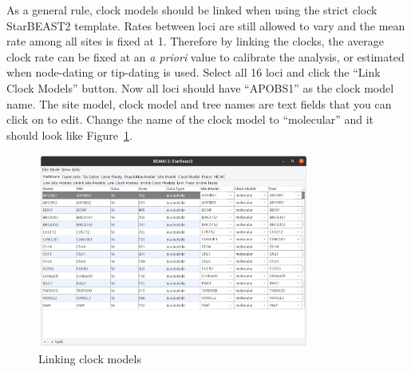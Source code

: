 \documentclass[12pt]{article}
\begin{document}
As a general rule, clock models should be linked when using the strict clock StarBEAST2 template. Rates between
loci are still allowed to vary and the mean rate among all sites is fixed at 1. Therefore
by linking the clocks, the average clock rate can be fixed at an \textit{a priori} value
to calibrate the analysis, or estimated when node-dating or tip-dating is used.
Select all 16 loci and click the ``Link Clock Models'' button. Now all loci
should have ``APOBS1'' as the clock model name. The site model, clock model and tree names are text fields that you can click on to edit. Change the name of the clock model to ``molecular'' and it should look like Figure~\ref{fig:linkModels}.

\begin{figure}[htb!]
\centering
\includegraphics[width=0.8\textwidth]{figures/linkModels.png}
\caption
{Linking clock models}
\label{fig:linkModels}
\end{figure}

\clearpage{}
\end{document}
